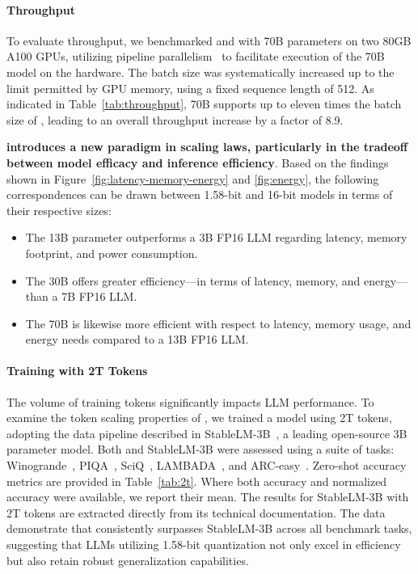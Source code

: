 \paragraph{Throughput}

To evaluate throughput, we benchmarked  and  with 70B parameters on two 80GB A100 GPUs, utilizing pipeline parallelism~\cite{gpipe} to facilitate execution of the  70B model on the hardware. The batch size was systematically increased up to the limit permitted by GPU memory, using a fixed sequence length of 512. As indicated in Table~\ref{tab:throughput},  70B supports up to eleven times the batch size of , leading to an overall throughput increase by a factor of 8.9.

\textbf{ introduces a new paradigm in scaling laws, particularly in the tradeoff between model efficacy and inference efficiency}. Based on the findings shown in Figure~\ref{fig:latency-memory-energy} and \ref{fig:energy}, the following correspondences can be drawn between 1.58-bit and 16-bit models in terms of their respective sizes:

\begin{itemize}
    \item The 13B parameter  outperforms a 3B FP16 LLM regarding latency, memory footprint, and power consumption.
    \item The 30B  offers greater efficiency—in terms of latency, memory, and energy—than a 7B FP16 LLM.
    \item The 70B  is likewise more efficient with respect to latency, memory usage, and energy needs compared to a 13B FP16 LLM.
\end{itemize}

\paragraph{Training with 2T Tokens}

The volume of training tokens significantly impacts LLM performance. To examine the token scaling properties of , we trained a model using 2T tokens, adopting the data pipeline described in StableLM-3B~\cite{StableLM-3B-4E1T}, a leading open-source 3B parameter model. Both  and StableLM-3B were assessed using a suite of tasks: Winogrande~\cite{winoGrande}, PIQA~\cite{piqa}, SciQ~\cite{sciq}, LAMBADA~\cite{lambada}, and ARC-easy~\cite{arc}. Zero-shot accuracy metrics are provided in Table~\ref{tab:2t}. Where both accuracy and normalized accuracy were available, we report their mean. The results for StableLM-3B with 2T tokens are extracted directly from its technical documentation. The data demonstrate that  consistently surpasses StableLM-3B across all benchmark tasks, suggesting that LLMs utilizing 1.58-bit quantization not only excel in efficiency but also retain robust generalization capabilities.

